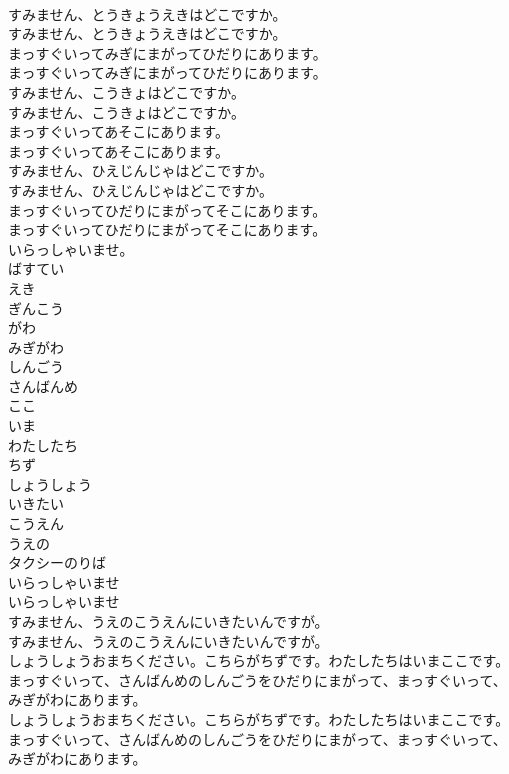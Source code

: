 \documentclass[8pt]{extreport}
\begin{document}
\begin{CJK}{UTF8}{min}
\\	すみません、とうきょうえきはどこですか。	
\\	すみません、とうきょうえきはどこですか。 
\\	まっすぐいってみぎにまがってひだりにあります。	
\\	まっすぐいってみぎにまがってひだりにあります。 
\\	すみません、こうきょはどこですか。	
\\	すみません、こうきょはどこですか。 
\\	まっすぐいってあそこにあります。	
\\	まっすぐいってあそこにあります。 
\\	すみません、ひえじんじゃはどこですか。	
\\	すみません、ひえじんじゃはどこですか。 
\\	まっすぐいってひだりにまがってそこにあります。	
\\	まっすぐいってひだりにまがってそこにあります。 
\\	いらっしゃいませ。
\\	ばすてい
\\	えき
\\	ぎんこう
\\	がわ
\\	みぎがわ
\\	しんごう
\\	さんばんめ
\\	ここ
\\	いま
\\	わたしたち
\\	ちず
\\	しょうしょう
\\	いきたい
\\	こうえん
\\	うえの
\\	タクシーのりば
\\	いらっしゃいませ 
\\	いらっしゃいませ 
\\	すみません、うえのこうえんにいきたいんですが。	
\\	すみません、うえのこうえんにいきたいんですが。 
\\	しょうしょうおまちください。こちらがちずです。わたしたちはいまここです。まっすぐいって、さんばんめのしんごうをひだりにまがって、まっすぐいって、みぎがわにあります。	
\\	しょうしょうおまちください。こちらがちずです。わたしたちはいまここです。まっすぐいって、さんばんめのしんごうをひだりにまがって、まっすぐいって、みぎがわにあります。 

\end{CJK}
\end{document}
